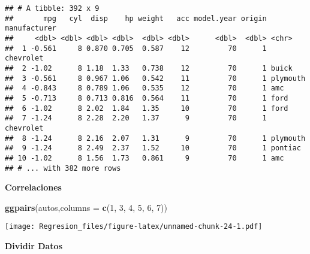 \documentclass[]{article}
\newenvironment{Shaded}{\begin{snugshade}}{\end{snugshade}}
\newcommand{\DataTypeTok}[1]{\textcolor[rgb]{0.13,0.29,0.53}{#1}}
\newcommand{\DecValTok}[1]{\textcolor[rgb]{0.00,0.00,0.81}{#1}}
\newcommand{\FloatTok}[1]{\textcolor[rgb]{0.00,0.00,0.81}{#1}}
\newcommand{\KeywordTok}[1]{\textcolor[rgb]{0.13,0.29,0.53}{\textbf{#1}}}
\newcommand{\NormalTok}[1]{#1}
\newcommand{\OperatorTok}[1]{\textcolor[rgb]{0.81,0.36,0.00}{\textbf{#1}}}
\newcommand{\OtherTok}[1]{\textcolor[rgb]{0.56,0.35,0.01}{#1}}
\newcommand{\StringTok}[1]{\textcolor[rgb]{0.31,0.60,0.02}{#1}}
\begin{document}
\begin{verbatim}
## # A tibble: 392 x 9
##       mpg   cyl  disp    hp weight   acc model.year origin manufacturer
##     <dbl> <dbl> <dbl> <dbl>  <dbl> <dbl>      <dbl>  <dbl> <chr>       
##  1 -0.561     8 0.870 0.705  0.587    12         70      1 chevrolet   
##  2 -1.02      8 1.18  1.33   0.738    12         70      1 buick       
##  3 -0.561     8 0.967 1.06   0.542    11         70      1 plymouth    
##  4 -0.843     8 0.789 1.06   0.535    12         70      1 amc         
##  5 -0.713     8 0.713 0.816  0.564    11         70      1 ford        
##  6 -1.02      8 2.02  1.84   1.35     10         70      1 ford        
##  7 -1.24      8 2.28  2.20   1.37      9         70      1 chevrolet   
##  8 -1.24      8 2.16  2.07   1.31      9         70      1 plymouth    
##  9 -1.24      8 2.49  2.37   1.52     10         70      1 pontiac     
## 10 -1.02      8 1.56  1.73   0.861     9         70      1 amc         
## # ... with 382 more rows
\end{verbatim}

\textbf{Correlaciones}

\begin{Shaded}
\begin{Highlighting}[]
\KeywordTok{ggpairs}\NormalTok{(autos,}\DataTypeTok{columns =} \KeywordTok{c}\NormalTok{(}\DecValTok{1}\NormalTok{, }\DecValTok{3}\NormalTok{, }\DecValTok{4}\NormalTok{, }\DecValTok{5}\NormalTok{, }\DecValTok{6}\NormalTok{, }\DecValTok{7}\NormalTok{))}
\end{Highlighting}
\end{Shaded}

\texttt{[image: Regresion\_files/figure-latex/unnamed-chunk-24-1.pdf]}

\textbf{Dividir Datos}

\begin{Shaded}
\end{Shaded}
\end{document}
